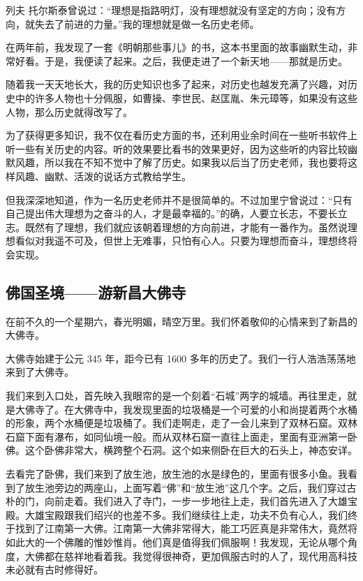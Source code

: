 \documentclass[UTF8,a4paper,titlepage,twoside,10.5pt]{article}
\begin{document}
列夫 托尔斯泰曾说过：“理想是指路明灯，没有理想就没有坚定的方向；没有方向，就失去了前进的力量。”我的理想就是做一名历史老师。

在两年前，我发现了一套《明朝那些事儿》的书，这本书里面的故事幽默生动，非常好看。于是，我便读了起来。之后，我便走进了一个新天地——那就是历史。

随着我一天天地长大，我的历史知识也多了起来，对历史也越发充满了兴趣，对历史中的许多人物也十分佩服，如曹操、李世民、赵匡胤、朱元璋等，如果没有这些人物，那么历史就得改写了。

为了获得更多知识，我不仅在看历史方面的书，还利用业余时间在一些听书软件上听一些有关历史的内容。听的效果要比看书的效果更好，因为这些听的内容比较幽默风趣，所以我在不知不觉中了解了历史。如果我以后当了历史老师，我也要将这样风趣、幽默、活泼的说话方式教给学生。

但我深深地知道，作为一名历史老师并不是很简单的。不过加里宁曾说过：“只有自己提出伟大理想为之奋斗的人，才是最幸福的。”的确，人要立长志，不要长立志。既然有了理想，我们就应该朝着理想的方向前进，才能有一番作为。虽然说理想看似对我遥不可及，但世上无难事，只怕有心人。只要为理想而奋斗，理想终将会实现。

\subsection{佛国圣境——游新昌大佛寺}
\label{sec:org3b26ecf}

在前不久的一个星期六，春光明媚，晴空万里。我们怀着敬仰的心情来到了新昌的大佛寺。

大佛寺始建于公元 345 年，距今已有 1600 多年的历史了。我们一行人浩浩荡荡地来到了大佛寺。

我们来到入口处，首先映入我眼帘的是一个刻着“石城”两字的城墙。再往里走，就是大佛寺了。在大佛寺中，我发现里面的垃圾桶是一个可爱的小和尚提着两个水桶的形象，两个水桶便是垃圾桶了。我们走啊走，走了一会儿来到了双林石窟。双林石窟下面有瀑布，如同仙境一般。而从双林石窟一直往上面走，里面有亚洲第一卧佛。这个卧佛非常大，横跨整个石洞。这个如来侧卧在巨大的石头上，神态安详。

去看完了卧佛，我们来到了放生池，放生池的水是绿色的，里面有很多小鱼。我看到了放生池旁边的两座山，上面写着“佛”和“放生池”这几个字。之后，我们穿过古朴的门，向前走着。我们进入了寺门，一步一步地往上走，我们首先进入了大雄宝殿。大雄宝殿跟我们绍兴的也差不多。我们继续往上走，功夫不负有心人，我们终于找到了江南第一大佛。江南第一大佛非常得大，能工巧匠真是非常伟大，竟然将如此大的一个佛雕的惟妙惟肖。他们真是值得我们佩服啊！我发现，无论从哪个角度，大佛都在慈祥地看着我。我觉得很神奇，更加佩服古时的人了，现代用高科技未必就有古时修得好。
\end{document}
